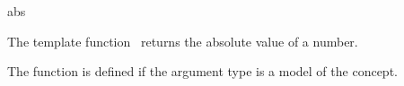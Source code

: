 \begin{ccRefFunction}{abs}

\ccDefinition

The template function \ccRefName\ returns the absolute value of a number.

The function is defined if the argument type 
is a model of the  concept. 



\ccSeeAlso
{} \\
\\
 
\end{ccRefFunction}
